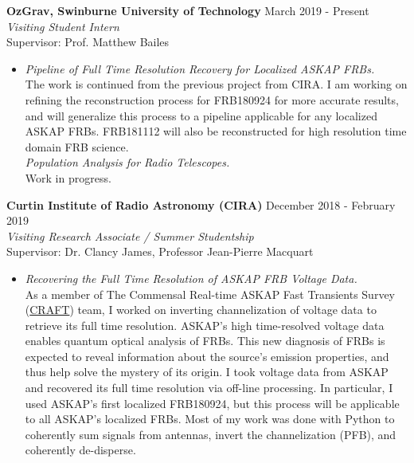 \documentclass[margin, 10pt]{res} %
\begin{document}
\begin{resume}
{\bf OzGrav, Swinburne University of Technology} \hfill March 2019 - Present \\
{\sl Visiting Student Intern} \\
Supervisor: Prof. Matthew Bailes
\begin{itemize}
\item[] {\sl Pipeline of Full Time Resolution Recovery for Localized ASKAP FRBs.}\\
The work is continued from the previous project from CIRA. I am working on refining the reconstruction process for FRB180924 for more accurate results, and will generalize this process to a pipeline applicable for any localized ASKAP FRBs. FRB181112 will also be reconstructed for high resolution time domain FRB science. \\
{\sl Population Analysis for Radio Telescopes.}\\
Work in progress.
\end{itemize} 

{\bf Curtin Institute of Radio Astronomy (CIRA)} \hfill December 2018 - February 2019 \\
{\sl Visiting Research Associate / Summer Studentship} \\
Supervisor: Dr. Clancy James, Professor Jean-Pierre Macquart
\begin{itemize}
\item[] {\sl Recovering the Full Time Resolution of ASKAP FRB Voltage Data.}\\
As a member of The Commensal Real-time ASKAP Fast Transients Survey (\href{http://astronomy.curtin.edu.au/research/craft/}{CRAFT}) team, I worked on inverting channelization of voltage data to retrieve its full time resolution. ASKAP's high time-resolved voltage data enables quantum optical analysis of FRBs. This new diagnosis of FRBs is expected to reveal information about the source's emission properties, and thus help solve the mystery of its origin. I took voltage data from ASKAP and recovered its full time resolution via off-line processing. In particular, I used ASKAP's first localized FRB180924, but this process will be applicable to all ASKAP's localized FRBs. Most of my work was done with Python to coherently sum signals from antennas, invert the channelization (PFB), and coherently de-disperse.
\end{itemize} 


\end{resume}
\end{document}
